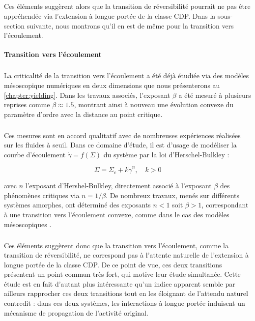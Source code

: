 \subparagraph{}Ces éléments suggèrent alors que la transition de réversibilité pourrait ne pas être appréhendée via l'extension à longue portée de la classe CDP. Dans la sous-section suivante, nous montrons qu'il en est de même pour la transition vers l'écoulement.

\paragraph{Transition vers l'écoulement}

\subparagraph{}La criticalité de la transition vers l'écoulement a été déjà étudiée via des modèles mésoscopique numériques en deux dimensions que nous présenterons au \autoref{chapter:yielding}\cite{lin_scaling_2014, liu_driving_2016, ferrero_criticality_2019, picard_slow_2005}. Dans les travaux associés, l'exposant $\beta$ a été mesuré à plusieurs reprises comme $\beta\approx 1.5$, montrant ainsi à nouveau une évolution convexe du paramètre d'ordre avec la distance au point critique.

\subparagraph{}Ces mesures sont en accord qualitatif avec de nombreuses expériences réalisées sur les fluides à seuil. Dans ce domaine d'étude, il est d'usage de modéliser la courbe d'écoulement $\dot{\gamma} = f(\Sigma)$ du système par la loi d'Herschel-Bulkley :

\begin{equation}
	\Sigma = \Sigma_c + k\dot{\gamma}^n, \quad k > 0
\end{equation}

\noindent avec $n$ l'exposant d'Hershel-Bulkley, directement associé à l'exposant $\beta$ des phénomènes critiques via $n=1/\beta$. De nombreux travaux, menés sur différents systèmes amorphes, ont déterminé des exposants $n<1$ soit $\beta > 1$, correspondant à une transition vers l'écoulement convexe, comme dans le cas des modèles mésoscopiques \cite{nicolas_deformation_2018}.

\subparagraph{}Ces éléments suggèrent donc que la transition vers l'écoulement, comme la transition de réversibilité, ne correspond pas à l'attente naturelle de l'extension à longue portée de la classe CDP. De ce point de vue, ces deux transitions présentent un point commun très fort, qui motive leur étude simultanée. Cette étude est en fait d'autant plus intéressante qu'un indice apparent semble par ailleurs rapprocher ces deux transitions tout en les éloignant de l'attendu naturel contredit : dans ces deux systèmes, les interactions à longue portée induisent un mécanisme de propagation de l'activité original.


